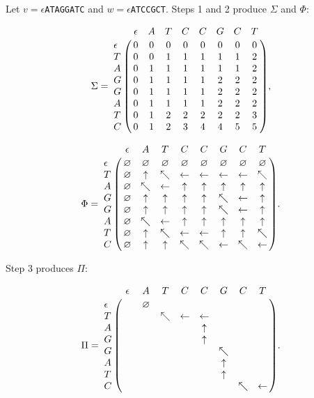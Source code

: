 \documentclass[a4paper]{article}
\begin{document}
Let $v = \epsilon$\verb+ATAGGATC+ and $w = \epsilon$\verb+ATCCGCT+. Steps 1 and 2 produce $\Sigma$ and $\Phi$:

\[ \Sigma = \bordermatrix{
\phantom{\epsilon} &  \epsilon & A & T & C & C & G & C & T \cr
\epsilon & 0 & 0 & 0 & 0 & 0 & 0 & 0  & 0 \cr
T & 0 & 0 & 1 & 1 & 1 & 1 & 1 & 2 \cr
A & 0 & 1 & 1 & 1 & 1 & 1 & 1 & 2 \cr
G & 0 & 1 & 1 & 1 & 1 & 2 & 2 & 2 \cr
G & 0 & 1 & 1 & 1 & 1 & 2 & 2 & 2 \cr
A & 0 & 1 & 1 & 1 & 1 & 2 & 2 & 2 \cr
T & 0 & 1 & 2 & 2 & 2 & 2 & 2 & 3 \cr
C & 0 & 1 & 2 & 3 & 4 & 4 & 5 & 5 \cr}, \]

\[ \Phi = \bordermatrix{
\phantom{\epsilon} &  \epsilon & A & T & C & C & G & C & T \cr
\epsilon & \varnothing & \varnothing & \varnothing & \varnothing & \varnothing & \varnothing & \varnothing  & \varnothing \cr
T & \varnothing & \uparrow & \nwarrow & \leftarrow & \leftarrow & \leftarrow & \leftarrow & \nwarrow \cr
A & \varnothing & \nwarrow & \leftarrow & \uparrow & \uparrow & \uparrow & \uparrow & \uparrow \cr
G & \varnothing & \uparrow & \uparrow & \uparrow & \uparrow & \nwarrow & \leftarrow & \uparrow \cr
G & \varnothing & \uparrow & \uparrow & \uparrow & \uparrow & \nwarrow & \leftarrow & \uparrow \cr
A & \varnothing & \nwarrow & \leftarrow & \uparrow & \uparrow & \uparrow & \uparrow & \uparrow \cr
T & \varnothing & \uparrow & \nwarrow & \leftarrow & \leftarrow & \uparrow & \uparrow & \nwarrow \cr
C & \varnothing & \uparrow & \uparrow & \nwarrow & \nwarrow & \leftarrow & \nwarrow & \leftarrow \cr}. \]

Step 3 produces $\Pi$:

\[ \Pi = \bordermatrix{
\phantom{\epsilon} &  \epsilon & A & T & C & C & G & C & T \cr
\epsilon & \phantom{\varnothing} & \varnothing  \cr
T & \phantom{\varnothing} & \phantom{\uparrow} & \nwarrow & \leftarrow & \leftarrow \cr
A & \phantom{\varnothing} & \phantom{\nwarrow} & \phantom{\leftarrow} & \phantom{\uparrow} & \uparrow \cr
G & \phantom{\varnothing} & \phantom{\nwarrow} & \phantom{\leftarrow} & \phantom{\uparrow} & \uparrow \cr
G & \phantom{\varnothing} & \phantom{\varnothing} & \phantom{\varnothing} & \phantom{\varnothing} & \phantom{\varnothing} & \nwarrow \cr
A & \phantom{\varnothing} & \phantom{\varnothing} & \phantom{\varnothing} & \phantom{\varnothing} & \phantom{\varnothing} & \uparrow \cr
T & \phantom{\varnothing} & \phantom{\varnothing} & \phantom{\varnothing} & \phantom{\varnothing} & \phantom{\varnothing} & \uparrow \cr
C & \phantom{\varnothing} & \phantom{\varnothing} & \phantom{\varnothing} & \phantom{\varnothing} & \phantom{\varnothing} & \phantom{\nwarrow} & \nwarrow & \leftarrow \cr}. \]
\end{document}
